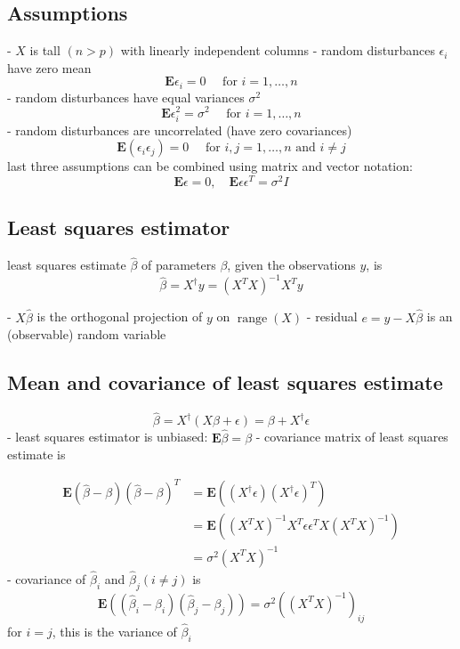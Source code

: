 \subsection{Assumptions}

- $ X $ is tall $ (n>p) $ with linearly independent columns
- random disturbances $ \epsilon_{i} $ have zero mean
$$
\mathbf{E} \epsilon_{i}=0 \quad \text { for } i=1, \ldots, n
$$
- random disturbances have equal variances $ \sigma^{2} $
$$
\mathbf{E} \epsilon_{i}^{2}=\sigma^{2} \quad \text { for } i=1, \ldots, n
$$
- random disturbances are uncorrelated (have zero covariances)
$$
\mathbf{E}\left(\epsilon_{i} \epsilon_{j}\right)=0 \quad \text { for } i, j=1, \ldots, n \text { and } i \neq j
$$
last three assumptions can be combined using matrix and vector notation:
$$
\mathbf{E} \epsilon=0, \quad \mathbf{E} \epsilon \epsilon^{T}=\sigma^{2} I
$$

\subsection{Least squares estimator}

least squares estimate $ \hat{\beta} $ of parameters $ \beta $, given the observations $ y $, is
$$
\hat{\beta}=X^{\dagger} y=\left(X^{T} X\right)^{-1} X^{T} y
$$


- $ X \hat{\beta} $ is the orthogonal projection of $ y $ on $ \operatorname{range}(X) $
- residual $ e=y-X \hat{\beta} $ is an (observable) random variable

\subsection{Mean and covariance of least squares estimate}

$$
\hat{\beta}=X^{\dagger}(X \beta+\epsilon)=\beta+X^{\dagger} \epsilon
$$
- least squares estimator is unbiased: $ \mathbf{E} \hat{\beta}=\beta $
- covariance matrix of least squares estimate is

$$
\begin{aligned}
\mathbf{E}(\hat{\beta}-\beta)(\hat{\beta}-\beta)^{T} &=\mathbf{E}\left(\left(X^{\dagger} \epsilon\right)\left(X^{\dagger} \epsilon\right)^{T}\right) \\
&=\mathbf{E}\left(\left(X^{T} X\right)^{-1} X^{T} \epsilon \epsilon^{T} X\left(X^{T} X\right)^{-1}\right) \\
&=\sigma^{2}\left(X^{T} X\right)^{-1}
\end{aligned}
$$
- covariance of $ \hat{\beta}_{i} $ and $ \hat{\beta}_{j}(i \neq j) $ is
$$
\mathbf{E}\left(\left(\hat{\beta}_{i}-\beta_{i}\right)\left(\hat{\beta}_{j}-\beta_{j}\right)\right)=\sigma^{2}\left(\left(X^{T} X\right)^{-1}\right)_{i j}
$$
for $ i=j $, this is the variance of $ \hat{\beta}_{i} $

